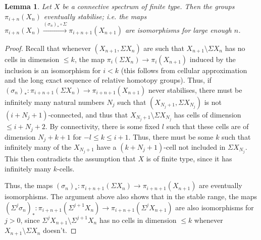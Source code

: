 \documentclass[11pt, titlepage]{article} %
\numberwithin{equation}{subsection}
\theoremstyle{plain}
\newtheorem{lemma}[theorem]{Lemma}
\theoremstyle{definition}
\begin{document}
\begin{lemma}\label{2504151105}
Let \(X\) be a connective spectrum of finite type. Then the groups \(\pi_{i+n}(X_n)\) eventually stabilise; i.e. the maps \(\pi_{i+n}(X_n) \xrightarrow{(\sigma_n)_*\circ \Sigma} \pi_{i+n+1}(X_{n+1})\) are isomorphisms for large enough \(n\). 
\end{lemma}

\begin{proof}
Recall that whenever \((X_{n+1}, \Sigma X_n)\) are such that \(X_{n+1}\setminus \Sigma X_n\) has no cells in dimension \(\leq k\), the map \(\pi_i(\Sigma X_n)\to \pi_i(X_{n+1})\) induced by the inclusion is an isomorphism for \(i<k\) (this follows from cellular approximation and the long exact sequence of relative homotopy groups). Thus, if \((\sigma_n)_* : \pi_{i+n+1}(\Sigma X_n)\to \pi_{i+n+1}(X_{n+1})\) never stabilises, there must be infinitely many natural numbers \(N_j\) such that \((X_{N_j+1}, \Sigma X_{N_j})\) is not \((i+N_j+1)\)-connected, and thus that \(X_{N_j+1}\setminus \Sigma X_{N_j}\) has cells of dimension \(\leq i+N_j+2\). By connectivity, there is some fixed \(l\) such that these cells are of dimension \(N_j+k+1\) for \(-l\leq k \leq i+1\). Thus, there must be some \(k\) such that infinitely many of the \(X_{N_j+1}\) have a \((k+N_j+1)\)-cell not included in \(\Sigma X_{N_j}\). This then contradicts the assumption that \(X\) is of finite type, since it has infinitely many \(k\)-cells. 

Thus, the maps \((\sigma_n)_* : \pi_{i+n+1}(\Sigma X_n)\to \pi_{i+n+1}(X_{n+1})\) are eventually isomorphisms. The argument above also shows that in the stable range, the maps \((\Sigma^j \sigma_n)_* : \pi_{i+n+1}(\Sigma^{j+1}X_n)\to \pi_{i+n+1}(\Sigma^j X_{n+1})\) are also isomorphisms for \(j>0\), since \(\Sigma^j X_{n+1}\setminus\Sigma^{j+1}X_n\) has no cells in dimension \(\leq k\) whenever \(X_{n+1}\setminus\Sigma X_n\) doesn't.


\end{proof}
\end{document}
